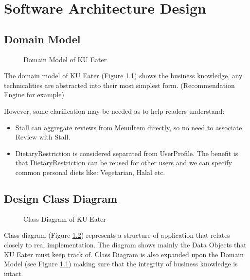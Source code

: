 \chapter{Software Architecture Design}
\label{chap:software-architecture-design}

\section{Domain Model}
\label{section:domain-model}

\begin{figure}[h!]
    \centering
    
    \caption{Domain Model of KU Eater}
    \label{fig:domain-model}
\end{figure}

The domain model of KU Eater (Figure \ref{fig:domain-model}) shows the business knowledge, any technicalities are abstracted into their most simplest form. (Recommendation Engine for example)

However, some clarification may be needed as to help readers understand:

\begin{itemize}
    \item Stall can aggregate reviews from MenuItem directly, so no need to associate Review with Stall.
    \item DietaryRestriction is considered separated from UserProfile. The benefit is that DietaryRestriction can be reused for other users
    and we can specify common personal diets like: Vegetarian, Halal etc.
\end{itemize}

\section{Design Class Diagram}
\label{section:design-class-diagram}

\begin{figure}[h!]
    \centering
    
    \caption{Class Diagram of KU Eater}
    \label{fig:class-diagram}
\end{figure}

Class diagram (Figure \ref{fig:class-diagram}) represents a structure of application that relates closely to real implementation. The diagram
shows mainly the Data Objects that KU Eater must keep track of. Class Diagram is also expanded upon the Domain Model (see Figure \ref{fig:domain-model})
making sure that the integrity of business knowledge is intact.


